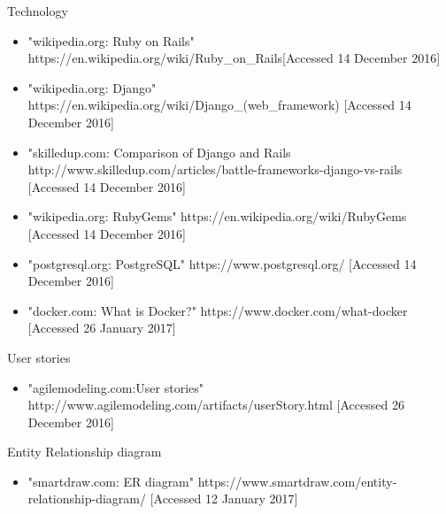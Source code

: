 \documentclass{l3proj}
\begin{document}
\label{tech}
Technology
\begin{itemize}

\item "wikipedia.org: Ruby on Rails"
\newline https://en.wikipedia.org/wiki/Ruby\_on\_Rails[Accessed 14 December 2016]

\item "wikipedia.org: Django"
\newline https://en.wikipedia.org/wiki/Django\_(web\_framework) [Accessed 14 December 2016]

\item "skilledup.com: Comparison of Django and Rails
\newline http://www.skilledup.com/articles/battle-frameworks-django-vs-rails [Accessed 14 December 2016]

\item "wikipedia.org: RubyGems"
\newline https://en.wikipedia.org/wiki/RubyGems [Accessed 14 December 2016]

\item "postgresql.org: PostgreSQL"
\newline https://www.postgresql.org/ [Accessed 14 December 2016]

\item "docker.com: What is Docker?"
\newline https://www.docker.com/what-docker [Accessed 26 January 2017]


\end{itemize}




\label{user_stories}

User stories

\begin{itemize}

\item "agilemodeling.com:User stories"
\newline http://www.agilemodeling.com/artifacts/userStory.html [Accessed 26 December 2016]

\end{itemize}


\label{er}
Entity Relationship diagram

\begin{itemize}

\item "smartdraw.com: ER diagram"
\newline https://www.smartdraw.com/entity-relationship-diagram/ [Accessed 12 January 2017]

\end{itemize}
\end{document}
